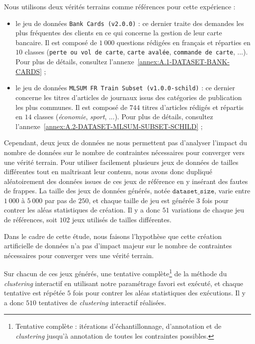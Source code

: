 			Nous utilisons deux vérités terrains comme références pour cette expérience :
			\begin{itemize}
				\item le jeu de données \texttt{Bank Cards (v2.0.0)} :
				ce dernier traite des demandes les plus fréquentes des clients en ce qui concerne la gestion de leur carte bancaire.
				Il est composé de $1~000$ questions rédigées en français et réparties en $10$ classes (\texttt{perte ou vol de carte}, \texttt{carte avalée}, \texttt{commande de carte}, ...).
				Pour plus de détails, consultez l'annexe~\ref{annex:A.1-DATASET-BANK-CARDS} ;
				\item le jeu de données \texttt{MLSUM FR Train Subset (v1.0.0-schild)} :
				ce dernier concerne les titres d'articles de journaux issus des catégories de publication les plus communes.
				Il est composé de $744$  titres d'articles rédigés et répartis en $14$ classes (\textit{économie}, \textit{sport}, ...).
				Pour plus de détails, consultez l'annexe~\ref{annex:A.2-DATASET-MLSUM-SUBSET-SCHILD} ;
			\end{itemize}

			Cependant, deux jeux de données ne nous permettent pas d'analyser l'impact du nombre de données sur le nombre de contraintes nécessaires pour converger vers une vérité terrain.
			Pour utiliser facilement plusieurs jeux de données de tailles différentes tout en maîtrisant leur contenu, nous avons donc dupliqué aléatoirement des données issues de ces jeux de référence en y insérant des fautes de frappes.
			La taille des jeux de données générés, notée $\texttt{dataset\_size}$, varie entre $1~000$ à $5~000$ par pas de $250$, et chaque taille de jeu est générée $3$ fois pour contrer les aléas statistiques de création.
			Il y a donc $51$ variations de chaque jeu de références, soit $102$ jeux utilisés de tailles différentes.
			
			\begin{leftBarWarning}
				Dans le cadre de cette étude, nous faisons l'hypothèse que cette création artificielle de données n'a pas d'impact majeur sur le nombre de contraintes nécessaires pour converger vers une vérité terrain.
			\end{leftBarWarning}
			
			Sur chacun de ces jeux générés, une tentative complète\footnote{
				Tentative complète : itérations d'échantillonnage, d'annotation et de \textit{clustering} jusqu'à annotation de toutes les contraintes possibles.
			}
			de la méthode du \textit{clustering} interactif en utilisant notre paramétrage favori est exécuté, et chaque tentative est répétée $5$ fois pour contrer les aléas statistiques des exécutions.
			Il y a donc $510$ tentatives de \textit{clustering} interactif réalisées.
			
